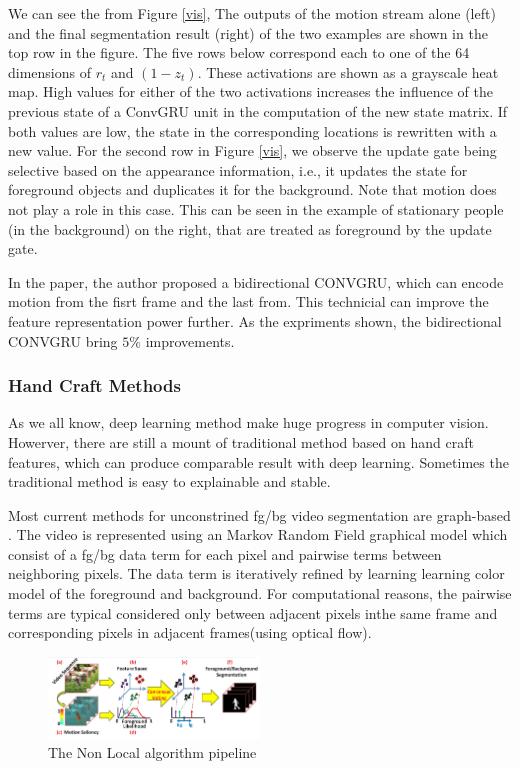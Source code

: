 We can see the from Figure \ref{vis}, The outputs of the motion stream alone (left) and the final segmentation result (right) of the two examples are
shown in the top row in the figure. The five rows below correspond each to one of the 64 dimensions of $r_t$ and $(1− z_t)$.
These activations are shown as a grayscale heat map. 
High values for either of the two activations increases the influence of the previous state of a ConvGRU unit in the computation of the new state matrix. 
If both values are low, the state in the corresponding locations is rewritten with a new value. 
For the second row in Figure \ref{vis}, we observe the update gate being selective based on the appearance information, i.e., it updates the
state for foreground objects and duplicates it for the background. Note that motion does not play a role in this case.
This can be seen in the example of stationary people (in the
background) on the right, that are treated as foreground by
the update gate.

In the paper, the author proposed a bidirectional CONVGRU, which can encode motion from the fisrt frame and the last from. This technicial can improve the feature
representation power further. As the expriments shown, the bidirectional CONVGRU bring $5\%$ improvements.



\subsubsection{Hand Craft Methods}


As we all know, deep learning method make huge progress in computer vision. Howerver, there are still a mount of traditional method based on 
hand craft features, which can produce comparable result with deep learning. Sometimes the traditional method is easy to explainable and stable.

Most current methods for unconstrined fg/bg video segmentation are graph-based \cite{Lee2011Key, Papazoglou2013Fast, zhang2013video}. The video
is represented using an Markov Random Field graphical model which consist of a fg/bg data term for each pixel and pairwise
terms between neighboring pixels. The data term is iteratively refined by learning learning color model of the foreground
and background. For computational reasons, the pairwise  terms are typical considered only between adjacent pixels inthe same 
frame and corresponding pixels in adjacent frames(using optical flow).

\begin{figure}[ht]
    \centering
    \includegraphics[width=0.5\textwidth]{figure/NLC.png}
    \caption{The Non Local algorithm pipeline}
    \label{nlc}
\end{figure}



